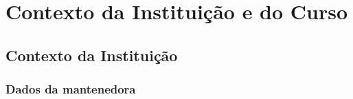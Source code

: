 \newpage
\section{Contexto da Instituição e do Curso}

\subsection{Contexto da Instituição}

\subsubsection{Dados da mantenedora}

